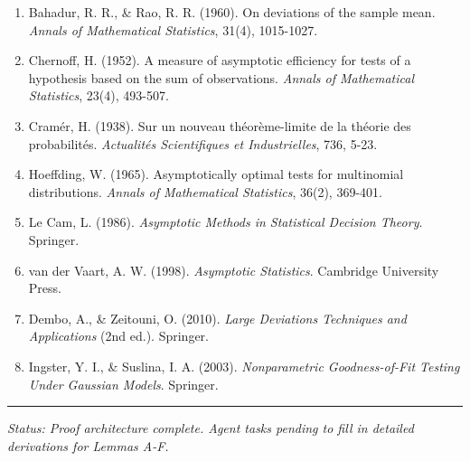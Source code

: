 \documentclass[
  12pt,
]{ctexart}
\providecommand{\tightlist}{%
  \setlength{\itemsep}{0pt}\setlength{\parskip}{0pt}}
\begin{document}
\begin{enumerate}
\def\labelenumi{\arabic{enumi}.}
\tightlist
\item
  Bahadur, R. R., \& Rao, R. R. (1960). On deviations of the sample mean. \emph{Annals of Mathematical Statistics}, 31(4), 1015-1027.
\item
  Chernoff, H. (1952). A measure of asymptotic efficiency for tests of a hypothesis based on the sum of observations. \emph{Annals of Mathematical Statistics}, 23(4), 493-507.
\item
  Cramér, H. (1938). Sur un nouveau théorème-limite de la théorie des probabilités. \emph{Actualités Scientifiques et Industrielles}, 736, 5-23.
\item
  Hoeffding, W. (1965). Asymptotically optimal tests for multinomial distributions. \emph{Annals of Mathematical Statistics}, 36(2), 369-401.
\item
  Le Cam, L. (1986). \emph{Asymptotic Methods in Statistical Decision Theory}. Springer.
\item
  van der Vaart, A. W. (1998). \emph{Asymptotic Statistics}. Cambridge University Press.
\item
  Dembo, A., \& Zeitouni, O. (2010). \emph{Large Deviations Techniques and Applications} (2nd ed.). Springer.
\item
  Ingster, Y. I., \& Suslina, I. A. (2003). \emph{Nonparametric Goodness-of-Fit Testing Under Gaussian Models}. Springer.
\end{enumerate}

\begin{center}\rule{0.5\linewidth}{0.5pt}\end{center}

\emph{Status: Proof architecture complete. Agent tasks pending to fill in detailed derivations for Lemmas A-F.}
\end{document}
